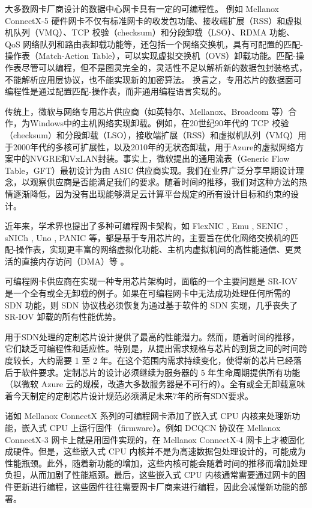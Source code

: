 大多数网卡厂商设计的数据中心网卡具有一定的可编程性。
例如 Mellanox ConnectX-5 硬件网卡不仅有标准网卡的收发包功能、接收端扩展（RSS）和虚拟机队列（VMQ）、TCP 校验（checksum）和分段卸载（LSO）、RDMA 功能、QoS 网络队列和路由表卸载功能等，还包括一个网络交换机，具有可配置的匹配-操作表（Match-Action Table），可以实现虚拟交换机（OVS）卸载功能。匹配-操作表尽管可以编程，但不是图灵完全的，灵活性不足以解析新的数据包封装格式，不能解析应用层协议，也不能实现新的加密算法。
换言之，专用芯片的数据面可编程性是通过配置匹配-操作表，而非通用编程语言实现的。


传统上，微软与网络专用芯片供应商（如英特尔、Mellanox、Broadcom 等）合作，为Windows中的主机网络实现卸载。例如，在20世纪90年代的 TCP 校验（checksum）和分段卸载（LSO），接收端扩展（RSS）和虚拟机队列（VMQ）用于2000年代的多核可扩展性，以及2010年的无状态卸载，用于Azure的虚拟网络方案中的NVGRE和VxLAN封装。事实上，微软提出的通用流表（Generic Flow Table，GFT）最初设计为由 ASIC 供应商实现。我们在业界广泛分享早期设计理念，以观察供应商是否能满足我们的要求。随着时间的推移，我们对这种方法的热情逐渐降低，因为没有出现能够满足云计算平台规定的所有设计目标和约束的设计。


近年来，学术界也提出了多种可编程网卡架构，如 FlexNIC \cite{kaufmann2015flexnic,kaufmann2016high}, Emu \cite{sultana2017emu}, SENIC \cite{radhakrishnan2014senic}, sNICh \cite{ram2010snich}, Uno \cite{le2017uno}, PANIC \cite{stephens2018your} 等，都是基于专用芯片的，主要旨在优化网络交换机的匹配-操作表，实现更丰富的网络虚拟化功能、主机内虚拟机间的高性能通信、更灵活的直接内存访问（DMA）等 \cite{kaufmann2015flexnic,kaufmann2016high}。

可编程网卡供应商在实现一种专用芯片架构时，面临的一个主要问题是 SR-IOV 是一个全有或全无卸载的例子。如果在可编程网卡中无法成功处理任何所需的 SDN 功能，则 SDN 协议栈必须恢复为通过基于软件的 SDN 实现，几乎丧失了 SR-IOV 卸载的所有性能优势。

用于SDN处理的定制芯片设计提供了最高的性能潜力。然而，随着时间的推移，它们缺乏可编程性和适应性。特别是，从提出需求规格与芯片的到货之间的时间跨度较长，大约需要 1 至 2 年。在这个范围内需求持续变化，使得新的芯片已经落后于软件要求。定制芯片的设计必须继续为服务器的 5 年生命周期提供所有功能（以微软 Azure 云的规模，改造大多数服务器是不可行的）。全有或全无卸载意味着今天制定的定制芯片设计规范必须满足未来7年的所有SDN要求。

诸如 Mellanox ConnectX 系列的可编程网卡添加了嵌入式 CPU 内核来处理新功能，嵌入式 CPU 上运行固件（firmware）。例如 DCQCN 协议在 Mellanox ConnectX-3 网卡上就是用固件实现的，在 Mellanox ConnectX-4 网卡上才被固化成硬件。但是，这些嵌入式 CPU 内核并不是为高速数据包处理设计的，可能成为性能瓶颈。此外，随着新功能的增加，这些内核可能会随着时间的推移而增加处理负担，从而加剧了性能瓶颈。最后，这些嵌入式 CPU 内核通常需要通过网卡的固件更新进行编程，这些固件往往需要网卡厂商来进行编程，因此会减慢新功能的部署。

